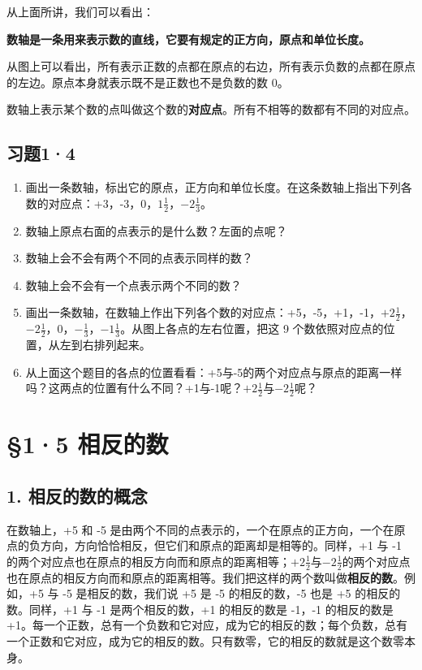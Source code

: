 从上面所讲，我们可以看出：

\textbf{数轴是一条用来表示数的直线，它要有规定的正方向，原点和单位长度。}

从图上可以看出，所有表示正数的点都在原点的右边，所有表示负数的点都在原点的左边。原点本身就表示既不是正数也不是负数的数 0。

数轴上表示某个数的点叫做这个数的\textbf{对应点}。所有不相等的数都有不同的对应点。

\subsection{习题1·4}

\begin{enumerate}
\item
  画出一条数轴，标出它的原点，正方向和单位长度。在这条数轴上指出下列各数的对应点：+3，-3，0，\(1\frac{1}{2}\)，\(-2\frac{1}{3}\)。
\item
  数轴上原点右面的点表示的是什么数？左面的点呢？
\item
  数轴上会不会有两个不同的点表示同样的数？
\item
  数轴上会不会有一个点表示两个不同的数？
\item
  画出一条数轴，在数轴上作出下列各个数的对应点：+5，-5，+1，-1，\(+2\frac{1}{2}\)，\(-2\frac{1}{2}\)，0，\(-\frac{1}{3}\)，\(-1\frac{1}{3}\)。从图上各点的左右位置，把这 9 个数依照对应点的位置，从左到右排列起来。
\item
  从上面这个题目的各点的位置看看：+5与-5的两个对应点与原点的距离一样吗？这两点的位置有什么不同？+1与-1呢？\(+2\frac{1}{2}\)与\(-2\frac{1}{2}\)呢？
\end{enumerate}

\section{§1·5 相反的数}

\subsection{1. 相反的数的概念}

在数轴上，+5 和 -5 是由两个不同的点表示的，一个在原点的正方向，一个在原点的负方向，方向恰恰相反，但它们和原点的距离却是相等的。同样，+1 与 -1 的两个对应点也在原点的相反方向而和原点的距离相等；\(+2\frac{1}{2}\)与\(-2\frac{1}{2}\)的两个对应点也在原点的相反方向而和原点的距离相等。我们把这样的两个数叫做\textbf{相反的数}。例如，+5 与 -5 是相反的数，我们说 +5 是 -5 的相反的数，-5 也是 +5 的相反的数。同样，+1 与 -1 是两个相反的数，+1 的相反的数是 -1，-1 的相反的数是 +1。每一个正数，总有一个负数和它对应，成为它的相反的数；每个负数，总有一个正数和它对应，成为它的相反的数。只有数零，它的相反的数就是这个数零本身。


